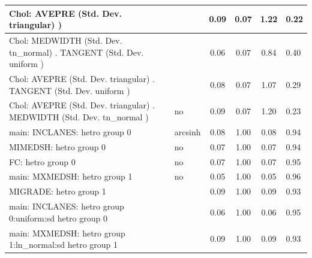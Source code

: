 \begin{table}
\begin{center}
\begin{tabular}{|l|l|c|c|c|l|}
			\hline
			 Chol: AVEPRE (Std. Dev. triangular) ) &  & 0.09 & 0.07 & 1.22 & 0.22 \\
			\hline
			 Chol: MEDWIDTH (Std. Dev. tn_normal) . TANGENT (Std. Dev.   uniform ) &  & 0.06 & 0.07 & 0.84 & 0.40 \\
			\hline
			 Chol: AVEPRE (Std. Dev. triangular) . TANGENT (Std. Dev.   uniform ) &  & 0.08 & 0.07 & 1.07 & 0.29 \\
			\hline
			 Chol: AVEPRE (Std. Dev. triangular) . MEDWIDTH (Std. Dev.   tn_normal ) & no & 0.09 & 0.07 & 1.20 & 0.23 \\
			\hline
			main: INCLANES: hetro group 0 & arcsinh & 0.08 & 1.00 & 0.08 & 0.94 \\
			\hline
			MIMEDSH: hetro group 0 & no & 0.07 & 1.00 & 0.07 & 0.94 \\
			\hline
			FC: hetro group 0 & no & 0.07 & 1.00 & 0.07 & 0.95 \\
			\hline
			main: MXMEDSH: hetro group 1 & no & 0.05 & 1.00 & 0.05 & 0.96 \\
			\hline
			MIGRADE: hetro group 1 &  & 0.09 & 1.00 & 0.09 & 0.93 \\
			\hline
			main: INCLANES: hetro group 0:uniform:sd  hetro group 0 &  & 0.06 & 1.00 & 0.06 & 0.95 \\
			\hline
			main: MXMEDSH: hetro group 1:ln_normal:sd  hetro group 1 &  & 0.09 & 1.00 & 0.09 & 0.93 \\
			\hline
		\end{tabular}
	\end{center}
\end{table}